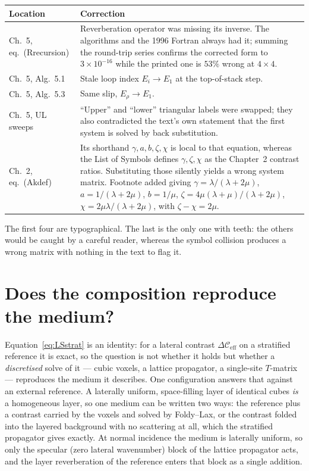 \documentclass[11pt,a4paper]{article}
\newcommand{\dC}{\Delta\mathcal{C}_{\mathrm{eff}}}
\begin{document}
\begin{center}
\begin{tabular}{p{}p{}}
\toprule
Location & Correction \\
\midrule
Ch.~5, eq.\ (Rrecursion) & Reverberation operator was missing its inverse.
The algorithms and the 1996 Fortran always had it; summing the round-trip
series confirms the corrected form to $3\times10^{-16}$ while the printed one
is $53\%$ wrong at $4\times4$. \\
Ch.~5, Alg.\ 5.1 & Stale loop index $E_i \to E_1$ at the top-of-stack step. \\
Ch.~5, Alg.\ 5.3 & Same slip, $E_\rho \to E_1$. \\
Ch.~5, UL sweeps & ``Upper'' and ``lower'' triangular labels were swapped;
they also contradicted the text's own statement that the first system is
solved by back substitution. \\
Ch.~2, eq.\ (Akdef) & Its shorthand $\gamma,a,b,\zeta,\chi$ is local to that
equation, whereas the List of Symbols defines $\gamma,\zeta,\chi$ as the
Chapter~2 contrast ratios.  Substituting those silently yields a wrong system
matrix.  Footnote added giving
$\gamma = \lambda/(\lambda+2\mu)$, $a = 1/(\lambda+2\mu)$, $b = 1/\mu$,
$\zeta = 4\mu(\lambda+\mu)/(\lambda+2\mu)$,
$\chi = 2\mu\lambda/(\lambda+2\mu)$, with $\zeta-\chi = 2\mu$. \\
\bottomrule
\end{tabular}
\end{center}

The first four are typographical.  The last is the only one with teeth: the
others would be caught by a careful reader, whereas the symbol collision
produces a wrong matrix with nothing in the text to flag it.

\section{Does the composition reproduce the medium?}\label{sec:correctness}

Equation~\eqref{eq:LSstrat} is an identity: for a lateral contrast $\dC$ on a stratified
reference it is exact, so the question is not whether it holds but whether a
\emph{discretised} solve of it --- cubic voxels, a lattice propagator, a single-site
$T$-matrix --- reproduces the medium it describes. One configuration answers that against an
external reference. A laterally uniform, space-filling layer of identical cubes \emph{is} a
homogeneous layer, so one medium can be written two ways: the reference plus a contrast carried by
the voxels and solved by Foldy--Lax, or the contrast folded into the layered background with no
scattering at all, which the stratified propagator gives exactly. At normal incidence the medium is
laterally uniform, so only the specular (zero lateral wavenumber) block of the lattice propagator
acts, and the layer reverberation of the reference enters that block as a single addition.
\end{document}
